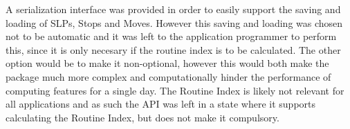 A serialization interface was provided in order to easily support the saving and loading of SLPs, Stops and Moves. However this saving and loading was chosen not to be automatic and it was left to the application programmer to perform this, since it is only necesary if the routine index is to be calculated. The other option would be to make it non-optional, however this would both make the package much more complex and computationally hinder the performance of computing features for a single day. The Routine Index is likely not relevant for all applications and as such the API was left in a state where it supports calculating the Routine Index, but does not make it compulsory. 